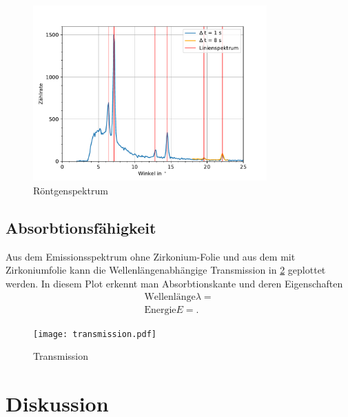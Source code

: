 \documentclass[11pt, a4paper]{article}
\begin{document}
    \begin{figure}
        \centering
        \includegraphics[width=0.8\textwidth]{NaCl-Spektrum.pdf}
        \caption{Röntgenspektrum}
        \label{fig:roentgenspektrum}
    \end{figure}

    \subsection{Absorbtionsfähigkeit}

    Aus dem Emissionsspektrum ohne Zirkonium-Folie und aus dem mit Zirkoniumfolie kann die Wellenlängenabhängige Transmission in \ref{fig:trans} geplottet werden. In diesem Plot erkennt man Absorbtionskante und deren Eigenschaften
    \begin{align}
        \text{Wellenlänge} \lambda = \\
        \text{Energie} E = .
    \end{align}

    \begin{figure}
        \centering
        \texttt{[image: transmission.pdf]}
        \caption{Transmission}
        \label{fig:trans}
    \end{figure}
    

    \section{Diskussion}

    
    
\end{document}
